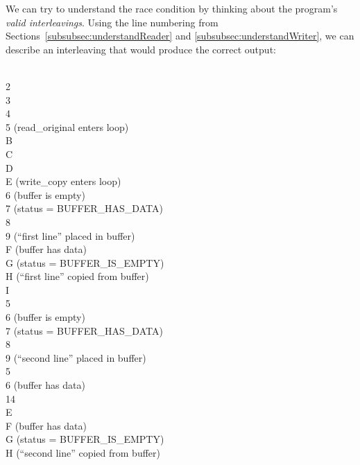     We can try to understand the race condition by thinking about the program's \textit{valid interleavings}.
    Using the line numbering from Sections~\ref{subsubsec:understandReader} and \ref{subsubsec:understandWriter}, we can describe an interleaving that would produce the correct output:
    \newpage
    \setlength{\columnseprule}{1pt}
    {\footnotesize\begin{multicols}{2} \phantom{foo} \\
        2 \\
        3 \\
        4 \\
        5   (read\_original enters loop) \\
        \phantom{foobarbaz} B \\
        \phantom{foobarbaz} C \\
        \phantom{foobarbaz} D \\
        \phantom{foobarbaz} E   (write\_copy enters loop) \\
        6   (buffer is empty) \\
        7   (status = BUFFER\_HAS\_DATA) \\
        8 \\
        9   (``first line'' placed in buffer) \\
        \phantom{foobarbaz} F   (buffer has data) \\
        \phantom{foobarbaz} G   (status = BUFFER\_IS\_EMPTY) \\
        \phantom{foobarbaz} H   (``first line'' copied from buffer) \\
        \phantom{foobarbaz} I \\
        5 \\
        6   (buffer is empty) \\
        7   (status = BUFFER\_HAS\_DATA) \\
        8 \\
        9   (``second line'' placed in buffer) \\
        5 \\
        6   (buffer has data) \\
        14 \\
        \phantom{foobarbaz} E \\
        \phantom{foobarbaz} F   (buffer has data) \\
        \phantom{foobarbaz} G   (status = BUFFER\_IS\_EMPTY) \\
        \phantom{foobarbaz} H   (``second line'' copied from buffer) \\

\end{multicols}}
